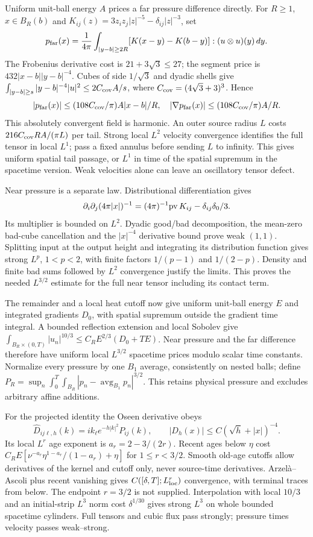 \documentclass[11pt]{article}
\begin{document}
Uniform unit-ball energy $A$ prices a far pressure difference directly.
For $R\ge1$, $x\in B_R(b)$ and
$K_{ij}(z)=3z_iz_j|z|^{-5}-\delta_{ij}|z|^{-3}$, set
\[
 p_{\rm far}(x)=\frac1{4\pi}\int_{|y-b|\ge2R}
 [K(x-y)-K(b-y)]:(u\otimes u)(y)\,dy.
\]
The Frobenius derivative cost is $21+3\sqrt3\le27$; the segment price
is $432|x-b||y-b|^{-4}$. Cubes of side $1/\sqrt3$ and dyadic shells
give $\int_{|y-b|\ge s}|y-b|^{-4}|u|^2\le2C_{\rm cov}A/s$, where
$C_{\rm cov}=(4\sqrt3+3)^3$. Hence
\[
 |p_{\rm far}(x)|\le(108C_{\rm cov}/\pi)A|x-b|/R,
 \quad |\nabla p_{\rm far}(x)|\le(108C_{\rm cov}/\pi)A/R.
\]
This absolutely convergent field is harmonic. An outer source radius $L$
costs $216C_{\rm cov}RA/(\pi L)$ per tail. Strong local $L^2$ velocity
convergence identifies the full tensor in local $L^1$; pass a fixed
annulus before sending $L$ to infinity. This gives uniform spatial tail
passage, or $L^1$ in time of the spatial supremum in the spacetime version.
Weak velocities alone can leave an oscillatory tensor defect.

Near pressure is a separate law. Distributional differentiation gives
\[
 \partial_i\partial_j(4\pi|x|)^{-1}
       =(4\pi)^{-1}{\rm pv}\,K_{ij}-\delta_{ij}\delta_0/3.
\]
Its multiplier is bounded on $L^2$. Dyadic good/bad decomposition, the
mean-zero bad-cube cancellation and the $|x|^{-4}$ derivative bound prove
weak $(1,1)$. Splitting input at the output height and integrating its
distribution function gives strong $L^p$, $1<p<2$, with finite factors
$1/(p-1)$ and $1/(2-p)$. Density and finite bad sums followed by $L^2$
convergence justify the limits. This proves the needed $L^{3/2}$ estimate
for the full near tensor including its contact term.

The remainder and a local heat cutoff now give uniform unit-ball energy
$E$ and integrated gradients $D_0$, with spatial supremum outside the
gradient time integral. A bounded reflection extension and local Sobolev
give $\int_{B_R\times(0,T)}|u_n|^{10/3}\le C_RE^{2/3}(D_0+TE)$.
Near pressure and the far difference therefore have uniform local
$L^{3/2}$ spacetime prices modulo scalar time constants. Normalize every
pressure by one $B_1$ average, consistently on nested balls; define
$P_R=\sup_n\int_0^T\int_{B_R}|p_n-\operatorname{avg}_{B_1}p_n|^{3/2}$.
This retains physical pressure and excludes arbitrary affine additions.

For the projected identity the Oseen derivative obeys
\[
 \widehat D_{ij\ell,h}(k)=ik_\ell e^{-h|k|^2}P_{ij}(k),
 \qquad |D_h(x)|\le C(\sqrt h+|x|)^{-4}.
\]
Its local $L^r$ age exponent is $a_r=2-3/(2r)$. Recent ages below
$\eta$ cost $C_RE[\nu^{-a_r}\eta^{1-a_r}/(1-a_r)+\eta]$ for
$1\le r<3/2$. Smooth old-age cutoffs allow derivatives of the kernel and
cutoff only, never source-time derivatives. Arzel\`a--Ascoli plus recent
vanishing gives $C([\delta,T];L^r_{\rm loc})$ convergence, with terminal
traces from below. The endpoint $r=3/2$ is not supplied. Interpolation
with local $10/3$ and an initial-strip $L^3$ norm cost $\delta^{1/30}$
gives strong $L^3$ on whole bounded spacetime cylinders. Full tensors and
cubic flux pass strongly; pressure times velocity passes weak--strong.
\end{document}
